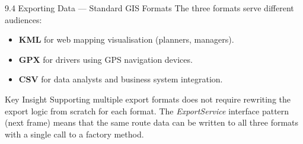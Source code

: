 \documentclass[aspectratio=169,10pt]{beamer}
\begin{document}
\begin{frame}[allowframebreaks]{9.4 Exporting Data --- Standard GIS Formats}
  \medskip
  The three formats serve different audiences:
  \begin{itemize}
    \item \textbf{KML} for web mapping visualisation (planners, managers).
    \item \textbf{GPX} for drivers using GPS navigation devices.
    \item \textbf{CSV} for data analysts and business system integration.
  \end{itemize}

  \begin{alertblock}{Key Insight}
    Supporting multiple export formats does not require rewriting the export
    logic from scratch for each format.  The \emph{ExportService} interface
    pattern (next frame) means that the same route data can be written to
    all three formats with a single call to a factory method.
  \end{alertblock}

\end{frame}
\end{document}
